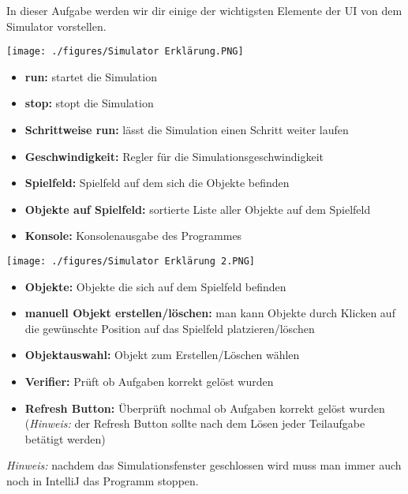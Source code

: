 
\label{ex4}

In dieser Aufgabe werden wir dir einige der wichtigsten Elemente der UI von dem Simulator vorstellen.
\begin{center}
    \texttt{[image: ./figures/Simulator Erklärung.PNG]}
\end{center}
\begin{itemize}
    \item \textbf{run:} startet die Simulation
    \item \textbf{stop:} stopt die Simulation
    \item \textbf{Schrittweise run:} lässt die Simulation einen Schritt weiter laufen
    \item \textbf{Geschwindigkeit:} Regler für die Simulationsgeschwindigkeit
    \item \textbf{Spielfeld:} Spielfeld auf dem sich die Objekte befinden
    \item \textbf{Objekte auf Spielfeld:} sortierte Liste aller Objekte auf dem Spielfeld
    \item \textbf{Konsole:} Konsolenausgabe des Programmes
\end{itemize}
\newpage
\begin{center}
    \texttt{[image: ./figures/Simulator Erklärung 2.PNG]}
\end{center}
\begin{itemize}
    \item \textbf{Objekte:} Objekte die sich auf dem Spielfeld befinden
    \item \textbf{manuell Objekt erstellen/löschen:} man kann Objekte durch Klicken auf die gewünschte Position auf das Spielfeld platzieren/löschen
    \item \textbf{Objektauswahl:} Objekt zum Erstellen/Löschen wählen
    \item \textbf{Verifier:} Prüft ob Aufgaben korrekt gelöst wurden
    \item \textbf{Refresh Button:} Überprüft nochmal ob Aufgaben korrekt gelöst wurden (\textit{Hinweis:} der Refresh Button sollte nach dem Lösen jeder Teilaufgabe betätigt werden)
\end{itemize}
\textit{Hinweis:} nachdem das Simulationsfenster geschlossen wird muss man immer auch noch in IntelliJ das Programm stoppen.
